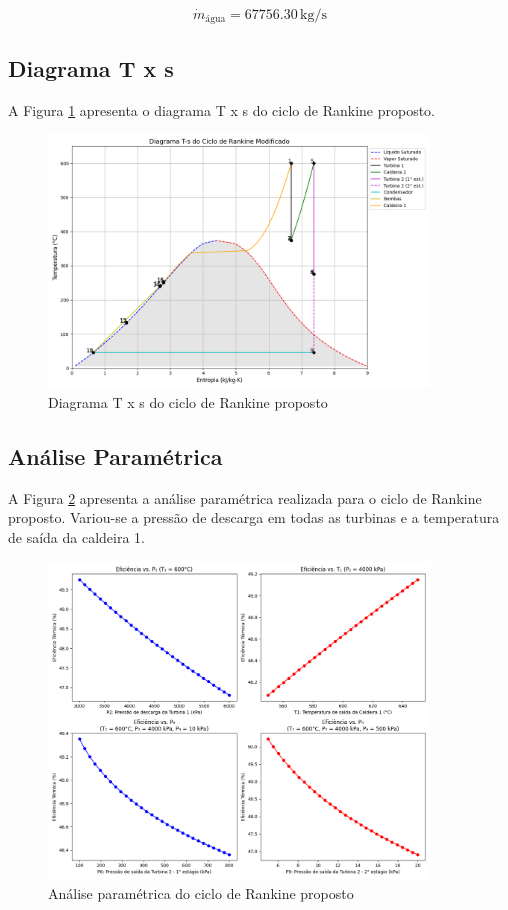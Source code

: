 \documentclass[
	article,			%
	11pt,				%
	oneside,			%
	a4paper,			%
	english,			%
	brazil,				%
	sumario=tradicional
	]{abntex2}
\begin{document}
$$\dot{m}_{\text{água}} = 67756.30 \, \si{\kilo\gram\per\second}$$

\subsection{Diagrama T x s}

A Figura \ref{fig:ts} apresenta o diagrama T x s do ciclo de Rankine proposto.

\begin{figure}[h]
	\centering
	\includegraphics[width=0.9\textwidth]{./images/ts.png}
	\caption{Diagrama T x s do ciclo de Rankine proposto}
	\label{fig:ts}
\end{figure}

\subsection{Análise Paramétrica}

A Figura \ref{fig:analise_parametrica} apresenta a análise paramétrica realizada para o ciclo de Rankine proposto. Variou-se a pressão de descarga em todas as turbinas e a temperatura de saída da caldeira 1.

\begin{figure}[h]
	\centering
	\includegraphics[width=0.9\textwidth]{./images/analise_parametrica.png}
	\caption{Análise paramétrica do ciclo de Rankine proposto}
	\label{fig:analise_parametrica}
\end{figure}
\end{document}
